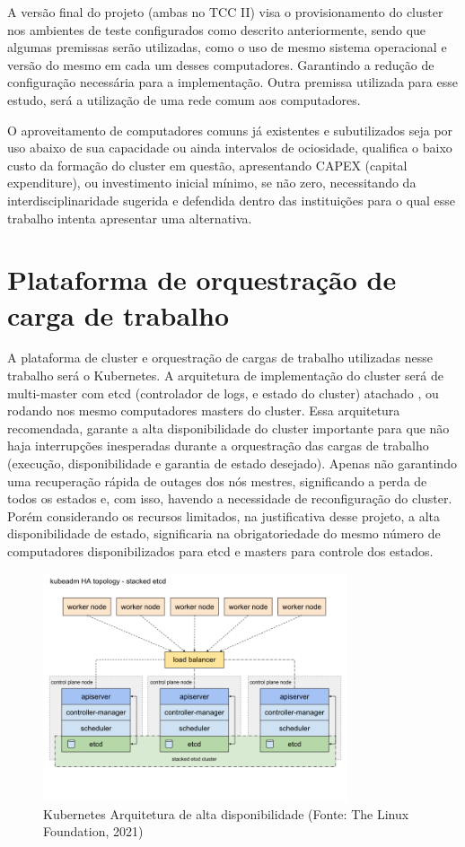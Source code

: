 A versão final do projeto (ambas no TCC II) visa o provisionamento do cluster nos ambientes de teste configurados como descrito anteriormente, sendo que algumas premissas serão utilizadas, como o uso de mesmo sistema operacional e versão do mesmo em cada um desses computadores. Garantindo a redução de configuração necessária para a implementação. Outra premissa utilizada para esse estudo, será a utilização de uma rede comum aos computadores. 

O aproveitamento de computadores comuns já existentes e subutilizados seja por uso abaixo de sua capacidade ou ainda intervalos de ociosidade, qualifica o baixo custo da formação do cluster em questão, apresentando CAPEX (capital expenditure),  ou investimento inicial mínimo, se não zero, necessitando da interdisciplinaridade sugerida e defendida dentro das instituições para o qual esse trabalho intenta apresentar uma alternativa.

\section{Plataforma de orquestração de carga de trabalho}

A plataforma de cluster e orquestração de cargas de trabalho utilizadas nesse trabalho será o Kubernetes. A arquitetura de implementação do cluster será de multi-master com etcd \cite{etcd2022} (controlador de logs, e estado do cluster) atachado \cite{kubernetes2022}, ou rodando nos mesmo computadores masters do cluster. 
Essa arquitetura recomendada, garante a alta disponibilidade do cluster importante para que não haja interrupções inesperadas durante a orquestração das cargas de trabalho (execução, disponibilidade e garantia de estado desejado). Apenas não garantindo uma recuperação rápida de outages dos nós mestres, significando a perda de todos os estados e, com isso, havendo a necessidade de reconfiguração do cluster. Porém considerando os recursos limitados, na justificativa desse projeto, a alta disponibilidade de estado, significaria na obrigatoriedade do mesmo número de computadores disponibilizados para etcd e masters para controle dos estados.


\begin{figure}[!ht]
    \centering
    \includegraphics[width=0.8\textwidth]{04-figuras/kubeadm-ha-topology-stacked-etcd.png}
    \caption{Kubernetes Arquitetura de alta disponibilidade (Fonte: The Linux Foundation\textregistered, 2021)}
    \label{fig:kubeadmha}
\end{figure}



